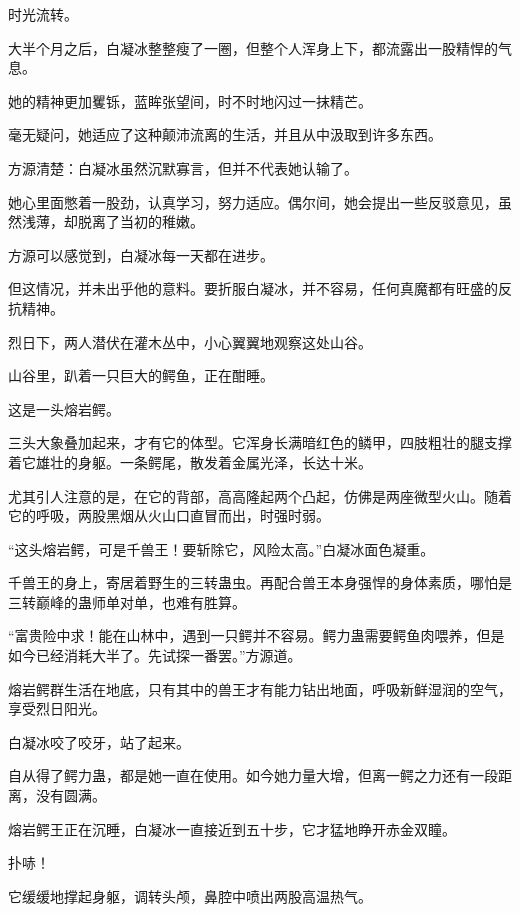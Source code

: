 
\begin{this_body}

时光流转。

大半个月之后，白凝冰整整瘦了一圈，但整个人浑身上下，都流露出一股精悍的气息。

她的精神更加矍铄，蓝眸张望间，时不时地闪过一抹精芒。

毫无疑问，她适应了这种颠沛流离的生活，并且从中汲取到许多东西。

方源清楚：白凝冰虽然沉默寡言，但并不代表她认输了。

她心里面憋着一股劲，认真学习，努力适应。偶尔间，她会提出一些反驳意见，虽然浅薄，却脱离了当初的稚嫩。

方源可以感觉到，白凝冰每一天都在进步。

但这情况，并未出乎他的意料。要折服白凝冰，并不容易，任何真魔都有旺盛的反抗精神。

烈日下，两人潜伏在灌木丛中，小心翼翼地观察这处山谷。

山谷里，趴着一只巨大的鳄鱼，正在酣睡。

这是一头熔岩鳄。

三头大象叠加起来，才有它的体型。它浑身长满暗红色的鳞甲，四肢粗壮的腿支撑着它雄壮的身躯。一条鳄尾，散发着金属光泽，长达十米。

尤其引人注意的是，在它的背部，高高隆起两个凸起，仿佛是两座微型火山。随着它的呼吸，两股黑烟从火山口直冒而出，时强时弱。

“这头熔岩鳄，可是千兽王！要斩除它，风险太高。”白凝冰面色凝重。

千兽王的身上，寄居着野生的三转蛊虫。再配合兽王本身强悍的身体素质，哪怕是三转巅峰的蛊师单对单，也难有胜算。

“富贵险中求！能在山林中，遇到一只鳄并不容易。鳄力蛊需要鳄鱼肉喂养，但是如今已经消耗大半了。先试探一番罢。”方源道。

熔岩鳄群生活在地底，只有其中的兽王才有能力钻出地面，呼吸新鲜湿润的空气，享受烈日阳光。

白凝冰咬了咬牙，站了起来。

自从得了鳄力蛊，都是她一直在使用。如今她力量大增，但离一鳄之力还有一段距离，没有圆满。

熔岩鳄王正在沉睡，白凝冰一直接近到五十步，它才猛地睁开赤金双瞳。

扑哧！

它缓缓地撑起身躯，调转头颅，鼻腔中喷出两股高温热气。


\end{this_body}
